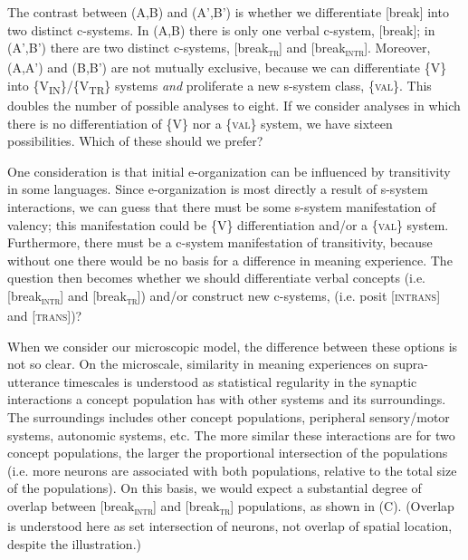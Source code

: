   The contrast between (A,B) and (A',B') is whether we differentiate [break] into two distinct c-systems. In (A,B) there is only one verbal c-system, [break]; in (A',B') there are two distinct c-systems, [break\textsc{\textsubscript{tr}}] and [break\textsc{\textsubscript{intr}}]. Moreover, (A,A') and (B,B') are not mutually exclusive, because we can differentiate \{V\} into \{V\textsubscript{IN}\}/\{V\textsubscript{TR}\} systems \textit{and} proliferate a new s-system class, \{\textsc{val}\}. This doubles the number of possible analyses to eight. If we consider analyses in which there is no differentiation of \{V\} nor a \{\textsc{val}\} system, we have sixteen possibilities. Which of these should we prefer? 

  One consideration is that initial e-organization can be influenced by transitivity in some languages. Since e-organization is most directly a result of s-system interactions, we can guess that there must be some s-system manifestation of valency; this manifestation could be \{V\} differentiation and/or a \{\textsc{val}\} system. Furthermore, there must be a c-system manifestation of transitivity, because without one there would be no basis for a difference in meaning experience. The question then becomes whether we should differentiate verbal concepts (i.e. [break\textsc{\textsubscript{intr}}] and [break\textsc{\textsubscript{tr}}]) and/or construct new c-systems, (i.e. posit [\textsc{intrans}] and [\textsc{trans}])?

  When we consider our microscopic model, the difference between these options is not so clear. On the microscale, similarity in meaning experiences on supra-utterance timescales is understood as statistical regularity in the synaptic interactions a concept population has with other systems and its surroundings. The surroundings includes other concept populations, peripheral sensory/motor systems, autonomic systems, etc. The more similar these interactions are for two concept populations, the larger the proportional intersection of the populations (i.e. more neurons are associated with both populations, relative to the total size of the populations). On this basis, we would expect a substantial degree of overlap between [break\textsc{\textsubscript{intr}}] and [break\textsc{\textsubscript{tr}}] populations, as shown in {}(C). (Overlap is understood here as set intersection of neurons, not overlap of spatial location, despite the illustration.)

